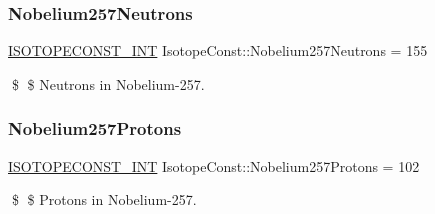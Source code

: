 \subsubsection{\texorpdfstring{Nobelium257\+Neutrons}{Nobelium257Neutrons}}
{\footnotesize\ttfamily \mbox{\hyperlink{group___isotope_const-_macros_ga5f18360b3e99483a35c32d789e62621c}{I\+S\+O\+T\+O\+P\+E\+C\+O\+N\+S\+T\+\_\+\+I\+NT}} Isotope\+Const\+::\+Nobelium257\+Neutrons = 155}

\$ \$ Neutrons in Nobelium-\/257. \mbox{\label{group___isotope_const-_nobelium-_no257_ga6683a39201b60889304a36c050873f51}} 
\subsubsection{\texorpdfstring{Nobelium257\+Protons}{Nobelium257Protons}}
{\footnotesize\ttfamily \mbox{\hyperlink{group___isotope_const-_macros_ga5f18360b3e99483a35c32d789e62621c}{I\+S\+O\+T\+O\+P\+E\+C\+O\+N\+S\+T\+\_\+\+I\+NT}} Isotope\+Const\+::\+Nobelium257\+Protons = 102}

\$ \$ Protons in Nobelium-\/257. 